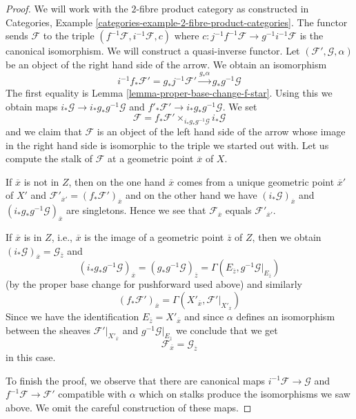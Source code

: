 \begin{proof}
We will work with the $2$-fibre product category as constructed in
Categories, Example \ref{categories-example-2-fibre-product-categories}.
The functor sends $\mathcal{F}$ to the triple
$(f^{-1}\mathcal{F}, i^{-1}\mathcal{F}, c)$ where
$c : j^{-1}f^{-1}\mathcal{F} \to g^{-1}i^{-1}\mathcal{F}$
is the canonical isomorphism. We will construct a quasi-inverse functor. Let
$(\mathcal{F}', \mathcal{G}, \alpha)$ be an object
of the right hand side of the arrow.
We obtain an isomorphism
$$
i^{-1}f_*\mathcal{F}' = g_*j^{-1}\mathcal{F}'
\xrightarrow{g_*\alpha}
g_*g^{-1}\mathcal{G}
$$
The first equality is Lemma \ref{lemma-proper-base-change-f-star}.
Using this we obtain maps
$i_*\mathcal{G} \to i_*g_*g^{-1}\mathcal{G}$
and $f'_*\mathcal{F}' \to i_*g_*g^{-1}\mathcal{G}$. We set
$$
\mathcal{F} = f_*\mathcal{F}' \times_{i_*g_*g^{-1}\mathcal{G}} i_*\mathcal{G}
$$
and we claim that $\mathcal{F}$ is an object of the left hand side
of the arrow whose image in the right hand side is isomorphic to
the triple we started out with. Let us compute the stalk of $\mathcal{F}$
at a geometric point $\overline{x}$ of $X$.

\medskip\noindent
If $\overline{x}$ is not
in $Z$, then on the one hand $\overline{x}$ comes from a unique
geometric point $\overline{x}'$ of $X'$ and
$\mathcal{F}'_{\overline{x}'} = (f_*\mathcal{F}')_{\overline{x}}$
and on the other hand we have $(i_*\mathcal{G})_{\overline{x}}$
and $(i_*g_*g^{-1}\mathcal{G})_{\overline{x}}$ are singletons.
Hence we see that $\mathcal{F}_{\overline{x}}$ equals
$\mathcal{F}'_{\overline{x}'}$.

\medskip\noindent
If $\overline{x}$ is in $Z$, i.e., $\overline{x}$ is the image of
a geometric point $\overline{z}$ of $Z$, then we obtain
$(i_*\mathcal{G})_{\overline{x}} = \mathcal{G}_{\overline{z}}$
and
$$
(i_*g_*g^{-1}\mathcal{G})_{\overline{x}} =
(g_*g^{-1}\mathcal{G})_{\overline{z}} =
\Gamma(E_{\overline{z}}, g^{-1}\mathcal{G}|_{E_{\overline{z}}})
$$
(by the proper base change for pushforward used above)
and similarly
$$
(f_*\mathcal{F}')_{\overline{x}} =
\Gamma(X'_{\overline{x}}, \mathcal{F}'|_{X'_{\overline{x}}})
$$
Since we have the identification
$E_{\overline{z}} = X'_{\overline{x}}$ and since $\alpha$
defines an isomorphism between the sheaves
$\mathcal{F}'|_{X'_{\overline{x}}}$ and
$g^{-1}\mathcal{G}|_{E_{\overline{z}}}$
we conclude that we get
$$
\mathcal{F}_{\overline{x}} = \mathcal{G}_{\overline{z}}
$$
in this case.

\medskip\noindent
To finish the proof, we observe that there are canonical maps
$i^{-1}\mathcal{F} \to \mathcal{G}$ and $f^{-1}\mathcal{F} \to \mathcal{F}'$
compatible with $\alpha$ which on stalks produce the isomorphisms
we saw above. We omit the careful construction of these maps.
\end{proof}

